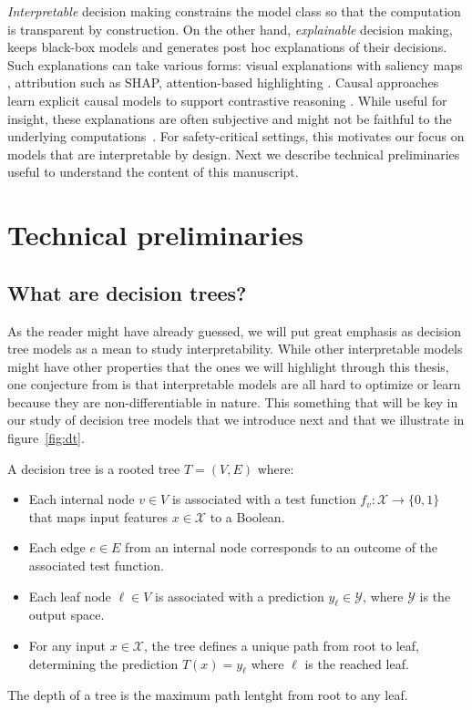 \textit{Interpretable} decision making constrains the model class so that the computation is transparent by construction. 
On the other hand, \textit{explainable} decision making, keeps black-box models and generates post hoc explanations of their decisions. 
Such explanations can take various forms: visual explanations with saliency maps \cite{Puri2020Explain}, attribution such as SHAP\cite{shap}, attention-based highlighting \cite{attention}.
Causal approaches learn explicit causal models to support contrastive reasoning \cite{madumal}.
While useful for insight, these explanations are often subjective and might not be faithful to the underlying computations~\cite{Atrey2020Exploratory}.
For safety-critical settings, this motivates our focus on models that are interpretable by design.
Next we describe technical preliminaries useful to understand the content of this manuscript.

\section{Technical preliminaries}

\subsection{What are decision trees?}\label{sec:dt}

As the reader might have already guessed, we will put great emphasis as decision tree models as a mean to study interpretability.
While other interpretable models might have other properties that the ones we will highlight through this thesis, one conjecture from \cite{glanois-survey} is that interpretable models are all hard to optimize or learn because they are non-differentiable in nature.
This something that will be key in our study of decision tree models that we introduce next and that we illustrate in figure~\ref{fig:dt}.

\begin{definition}
    A decision tree is a rooted tree $T = (V, E)$ where:
    \begin{itemize}
    \item Each internal node $v \in V$ is associated with a test function $f_v: \mathcal{X} \rightarrow \{0, 1\}$ that maps input features $x \in \mathcal{X}$ to a Boolean.
    \item Each edge $e \in E$ from an internal node corresponds to an outcome of the associated test function.
    \item Each leaf node $\ell \in V$ is associated with a prediction $y_\ell \in \mathcal{Y}$, where $\mathcal{Y}$ is the output space.
    \item For any input $x \in \mathcal{X}$, the tree defines a unique path from root to leaf, determining the prediction $T(x) = y_\ell$ where $\ell$ is the reached leaf.
    \end{itemize}
    The depth of a tree is the maximum path lentght from root to any leaf.
    \end{definition}

